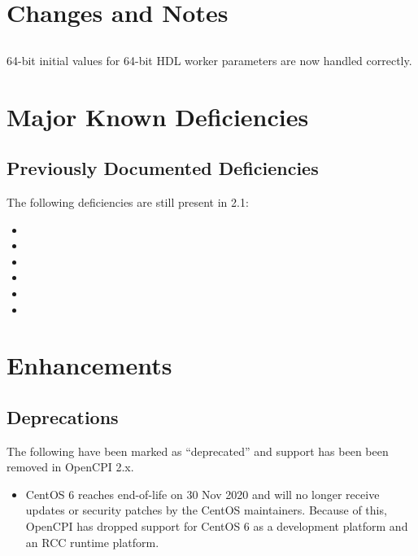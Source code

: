 \section{Changes and Notes}

\subsection{}
\label{sec:21_ocpigen}
64-bit initial values for 64-bit HDL worker parameters are now handled correctly.

\section{Major Known Deficiencies}
\label{sec:21_bugs}

\subsection{Previously Documented Deficiencies}
The following deficiencies are still present in 2.1:
\begin{itemize}
\setlength\itemsep{0em} %
\item {}
\item {}
\item {}
\item {}
\item {}
\item {}
\end{itemize}


\beginoldnotes
{}
\def\ocpiversion{v2.0.0}
\section{Enhancements}

\subsection{Deprecations}
\label{sec:20_deprecations}
The following have been marked as ``deprecated'' and support has been been removed in OpenCPI 2.x.
\begin{itemize}
\item CentOS 6 reaches end-of-life on 30 Nov 2020 and will no longer receive updates or security patches by the CentOS maintainers. Because of this, OpenCPI has dropped support for CentOS 6 as a development platform and an RCC runtime platform.
\end{itemize}

